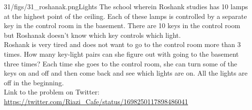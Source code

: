 \begin{problem}{31/figs/31_roshanak.png}{Lights} The school wherein Roshank studies has 10 lamps at the highest point of the ceiling. Each of these lamps is controlled by a separate key in the control room in the basement. There are 10 keys in the control room but Roshanak doesn't know which key controls which light.\\[0.2cm]

Roshank is very tired and does not want to go to the control room more than 3 times. How many key-light pairs can she figure out with going to the basement three times? Each time she goes to the control room, she can turn some of the keys on and off and then come back and see which lights are on. All the lights are off in the beginning.\\[0.2cm]

Link to the problem on Twitter:  \url{https://twitter.com/Riazi_Cafe/status/1698250117898486041}\end{problem}
